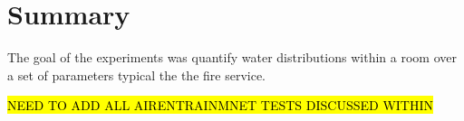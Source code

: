 \documentclass[12pt,oneside]{book}
\begin{document}
\chapter{Summary}

The goal of the experiments was quantify water distributions within a room over a set of parameters typical the the fire service. 




\clearpage

\appendix

\hl{NEED TO ADD ALL AIRENTRAINMNET TESTS DISCUSSED WITHIN}




\end{document}
